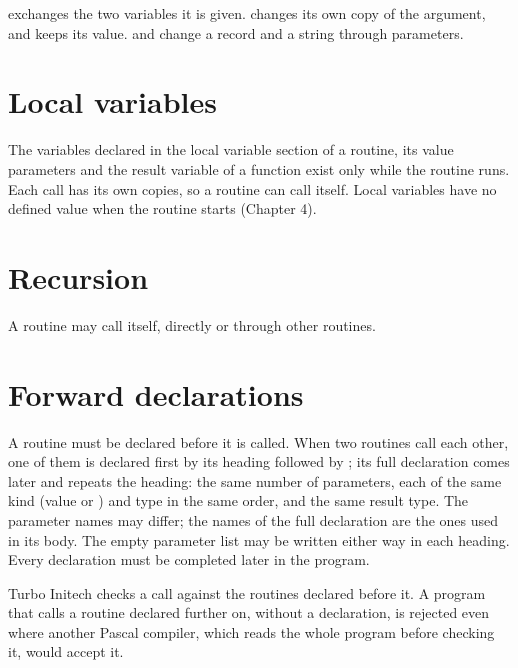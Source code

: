 

 exchanges the two variables it is given.   changes its
own copy of the argument, and  keeps its value.   and
 change a record and a string through  parameters.

\section{Local variables}
The variables declared in the local variable section of a routine, its
value parameters and the result variable of a function exist only while the
routine runs.  Each call has its own copies, so a routine can call itself.
Local variables have no defined value when the routine starts (Chapter 4).

\section{Recursion}
A routine may call itself, directly or through other routines.



\section{Forward declarations}
A routine must be declared before it is called.  When two routines call
each other, one of them is declared first by its heading followed by
; its full declaration comes later and repeats the heading: the
same number of parameters, each of the same kind (value or ) and
type in the same order, and the same result type.  The parameter names may
differ; the names of the full declaration are the ones used in its body.
The empty parameter list may be written either way in each heading.  Every  declaration must be completed
later in the program.



Turbo
Initech checks a call against the routines declared before it.  A program
that calls a routine declared further on, without a 
declaration, is rejected even where another Pascal compiler, which reads
the whole program before checking it, would accept it.
